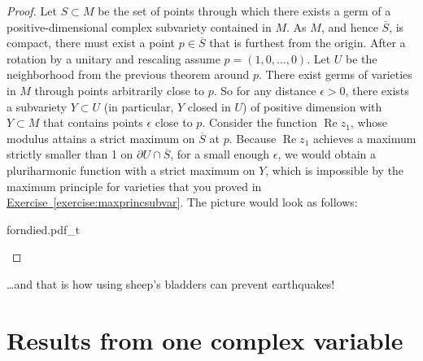 \documentclass[12pt,openany]{book}
\renewcommand{\Re}{\operatorname{Re}}
\theoremstyle{plain}
\theoremstyle{remark}
\theoremstyle{definition}
\theoremstyle{exercise}
\theoremstyle{example}
\newcommand{\exerciseref}[1]{\hyperref[#1]{Exercise~\ref*{#1}}}
\begin{document}
\begin{proof}
Let $S \subset M$ be the set of points through which there exists 
a germ of a positive-dimensional complex subvariety contained in $M$.
As $M$, and hence $\overline{S}$, is compact,
there must exist a point $p \in \overline{S}$
that is furthest from
the origin.  After a rotation by a unitary and rescaling assume
$p=(1,0,\ldots,0)$.  Let $U$ be the neighborhood from the previous
theorem around $p$.  There exist germs of varieties in $M$ through points
arbitrarily close to $p$.  So for any distance $\epsilon > 0$,
there exists a subvariety $Y \subset U$ (in particular, $Y$ closed in $U$)
of positive dimension with $Y \subset M$ that contains points 
$\epsilon$ close to $p$.  Consider the function $\Re z_1$, whose modulus attains a
strict maximum on $\overline{S}$ at $p$.  Because $\Re z_1$ achieves a maximum
strictly smaller than 1 on $\partial U \cap \overline{S}$, for a small enough $\epsilon$,
we would obtain a pluriharmonic function with a strict
maximum on $Y$, which is impossible by the maximum principle for
varieties that you proved in \exerciseref{exercise:maxprincsubvar}.
The picture would look as follows:
\begin{center}
\medskip
{forndied.pdf_t}
\end{center}
\end{proof}

\vspace*{1in}

\ldots and that is how using sheep's bladders can prevent
earthquakes!


\appendix


\chapter{Results from one complex variable} \label{ap:onevarresults}

\end{document}
